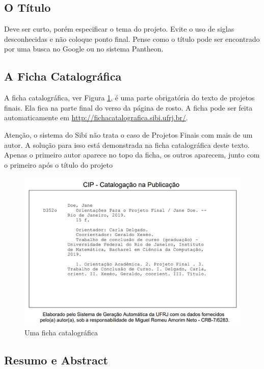 \subsection{O Título}
Deve ser curto, porém especificar o tema do projeto. Evite o uso de siglas desconhecidas e não coloque ponto final. Pense como o título pode ser encontrado por uma busca no Google ou no sistema Pantheon.

\subsection{A Ficha Catalográfica}

A ficha catalográfica, ver Figura \ref{fig:ficha}, é uma parte obrigatória do texto de projetos finais. Ela fica na parte final do verso da página de rosto. A ficha pode ser feita automaticamente em \url{http://fichacatalografica.sibi.ufrj.br/}.

Atenção, o sistema do Sibi não trata o caso de Projetos Finais com mais de um autor. A solução para isso está demonstrada na ficha catalográfica deste texto. Apenas o primeiro autor aparece no topo da ficha, os outros aparecem, junto com o primeiro após o título do projeto





\begin{figure}[tbh]
    \centering
    \includegraphics[width=0.9\linewidth]{imagens/ficha}
    \caption{Uma ficha catalográfica}
    \label{fig:ficha}
\end{figure}


\subsection{Resumo e Abstract}


